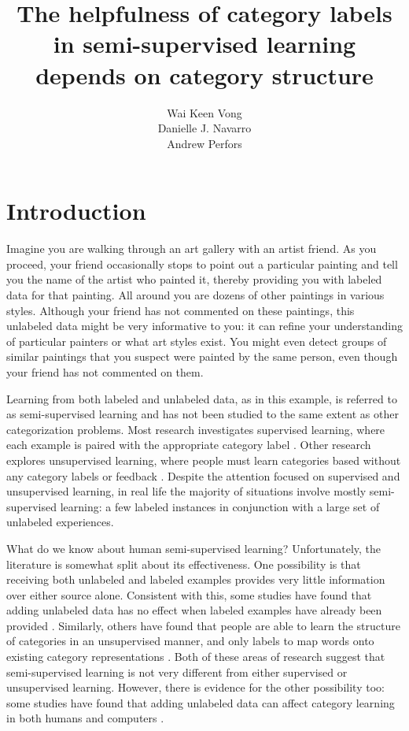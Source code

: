 \documentclass[a4paper, doc]{apa6}
\title{The helpfulness of category labels in semi-supervised learning depends on category structure}
\author{\normalsize Wai Keen Vong \\ Danielle J. Navarro \\ Andrew Perfors}
\affiliation{\vspace*{6pt} School of Psychology \\ University of Adelaide}
\date{}
\begin{document}
\maketitle

\section{Introduction}


Imagine you are walking through an art gallery with an artist friend. As you proceed, your friend occasionally stops to point out a particular painting and tell you the name of the artist who painted it, thereby providing you with labeled data for that painting. All around you are dozens of other paintings in various styles.
Although your friend has not commented on these paintings, this unlabeled data might be very informative to you: it can refine your understanding of particular painters or what art styles exist. You might even detect groups of similar paintings that you suspect were painted by the same person, even though your friend has not commented on them.

Learning from both labeled and unlabeled data, as in this example, is referred to as semi-supervised learning \cite{zhu2007humans, gibson2013human} and has not been studied to the same extent as other categorization problems. Most research investigates supervised learning, where each example is paired with the appropriate category label \cite{medin1978context, nosofsky1986attention}. Other research explores  unsupervised learning, where people must learn categories based without any category labels or feedback \cite{love2002comparing, pothos2002simplicity, pothos2011measuring}. Despite the attention focused on supervised and unsupervised learning, in real life the majority of situations involve mostly semi-supervised learning: a few labeled instances in conjunction with a large set of unlabeled experiences.

What do we know about human semi-supervised learning? Unfortunately, the literature is somewhat split about its effectiveness. One possibility is that receiving both unlabeled and labeled examples provides very little information over either source alone. Consistent with this, some studies have found that adding unlabeled data has no effect when labeled examples have already been provided \cite{vandist2009semisupervised,mcdonnell2012sparse}. Similarly, others have found that people are able to learn the structure of categories in an unsupervised manner, and only labels to map words onto existing category representations \cite{bloom2002children}. Both of these areas of research suggest that semi-supervised learning is not very different from either supervised or unsupervised learning. However, there is evidence for the other possibility too: some studies have found that adding unlabeled data can affect category learning in both humans \cite{zhu2007humans,lake2011estimating,kalish2011can, gibson2013human} and computers \cite{chapelle2006semi}.
\end{document}
